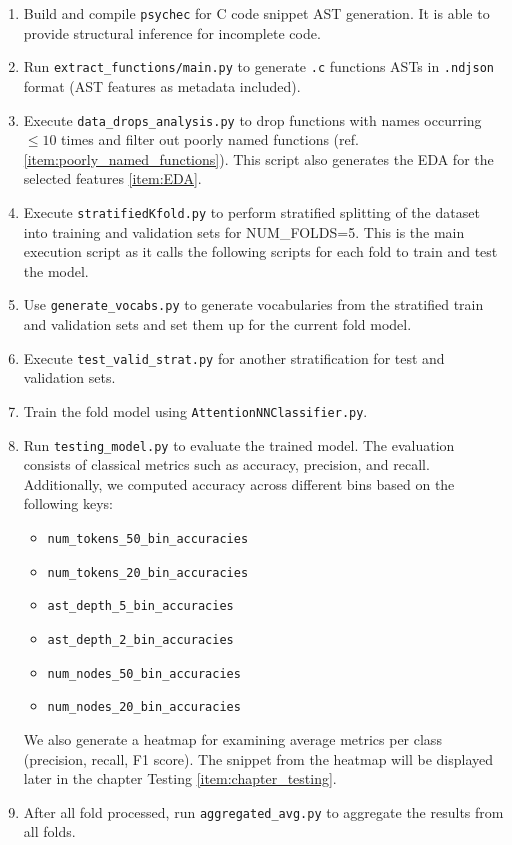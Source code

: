 \documentclass[10pt,english,a4paper]{report}
\begin{document}
 \begin{enumerate}
    \item Build and compile \texttt{psychec} for C code snippet AST generation. It is able to provide structural inference for incomplete code.

    \item Run \texttt{extract\_functions/main.py} to generate \texttt{.c} functions ASTs in \texttt{.ndjson} format (AST features as metadata included).

    \item Execute \texttt{data\_drops\_analysis.py} to drop functions with names occurring $\leq 10$ times and filter out poorly named functions (ref. \ref{item:poorly_named_functions}).
    This script also generates the EDA for the selected features \ref{item:EDA}.

    \item Execute \texttt{stratifiedKfold.py} to perform stratified splitting of the dataset into training and validation sets for NUM\_FOLDS=5. This is the main execution
    script as it calls the following scripts for each fold to train and test the model.
   
    \item Use \texttt{generate\_vocabs.py} to generate vocabularies from the stratified train and validation sets and set them up for the current fold model.

    \item Execute \texttt{test\_valid\_strat.py} for another stratification for test and validation sets.

    \item Train the fold model using \texttt{AttentionNNClassifier.py}.

    \item Run \texttt{testing\_model.py} to evaluate the trained model. The evaluation consists of
    classical metrics such as accuracy, precision, and recall. Additionally, we computed accuracy across
    different bins based on the following keys:
   
    \begin{itemize}
        \item \texttt{num\_tokens\_50\_bin\_accuracies}
        \item \texttt{num\_tokens\_20\_bin\_accuracies}
        \item \texttt{ast\_depth\_5\_bin\_accuracies}
        \item \texttt{ast\_depth\_2\_bin\_accuracies}
        \item \texttt{num\_nodes\_50\_bin\_accuracies}
        \item \texttt{num\_nodes\_20\_bin\_accuracies}
    \end{itemize}

    We also generate a heatmap for examining average metrics per class (precision, recall, F1 score). The snippet from the heatmap will be displayed later in the chapter Testing \ref{item:chapter_testing}.


    \item After all fold processed, run \texttt{aggregated\_avg.py} to aggregate the results from all folds.
\end{enumerate}
\end{document}

